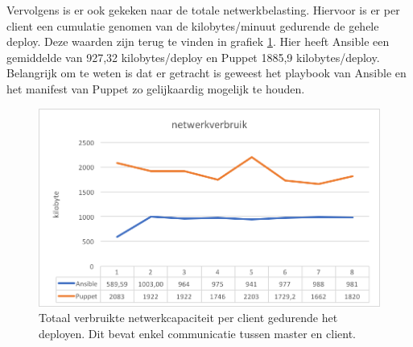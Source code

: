 Vervolgens is er ook gekeken naar de totale netwerkbelasting. Hiervoor is er per client een cumulatie genomen van de kilobytes/minuut gedurende de gehele deploy. Deze waarden zijn terug te vinden in grafiek \ref{fig:netwerkverbruik}. Hier heeft Ansible een gemiddelde van 927,32 kilobytes/deploy en Puppet 1885,9 kilobytes/deploy. Belangrijk om te weten is dat er getracht is geweest het playbook van Ansible en het manifest van Puppet zo gelijkaardig mogelijk te houden. 


\begin{figure}
  \includegraphics[width=\linewidth]{img/netwerkverbruik.png}
 \caption{Totaal verbruikte netwerkcapaciteit per client gedurende het deployen. Dit bevat enkel communicatie tussen master en client.}  
  \label{fig:netwerkverbruik}
\end{figure}


